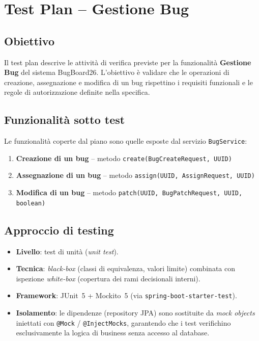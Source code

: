 
\section{Test Plan – Gestione Bug}

\subsection{Obiettivo}
Il test plan descrive le attività di verifica previste per la funzionalità
\textbf{Gestione Bug} del sistema BugBoard26.
L'obiettivo è validare che le operazioni di creazione, assegnazione e
modifica di un bug rispettino i requisiti funzionali e le regole di
autorizzazione definite nella specifica.

\subsection{Funzionalità sotto test}
Le funzionalità coperte dal piano sono quelle esposte dal servizio
\texttt{BugService}:

\begin{enumerate}
    \item \textbf{Creazione di un bug} – metodo \texttt{create(BugCreateRequest, UUID)}
    \item \textbf{Assegnazione di un bug} – metodo \texttt{assign(UUID, AssignRequest, UUID)}
    \item \textbf{Modifica di un bug} – metodo \texttt{patch(UUID, BugPatchRequest, UUID, boolean)}
\end{enumerate}

\subsection{Approccio di testing}

\begin{itemize}
    \item \textbf{Livello}: test di unità (\emph{unit test}).
    \item \textbf{Tecnica}: \emph{black-box} (classi di equivalenza,
          valori limite) combinata con ispezione \emph{white-box}
          (copertura dei rami decisionali interni).
    \item \textbf{Framework}: JUnit~5 + Mockito~5 (via
          \texttt{spring-boot-starter-test}).
    \item \textbf{Isolamento}: le dipendenze (repository JPA) sono sostituite
          da \emph{mock objects} iniettati con \texttt{@Mock} /
          \texttt{@InjectMocks}, garantendo che i test verifichino
          esclusivamente la logica di business senza accesso al database.
\end{itemize}

